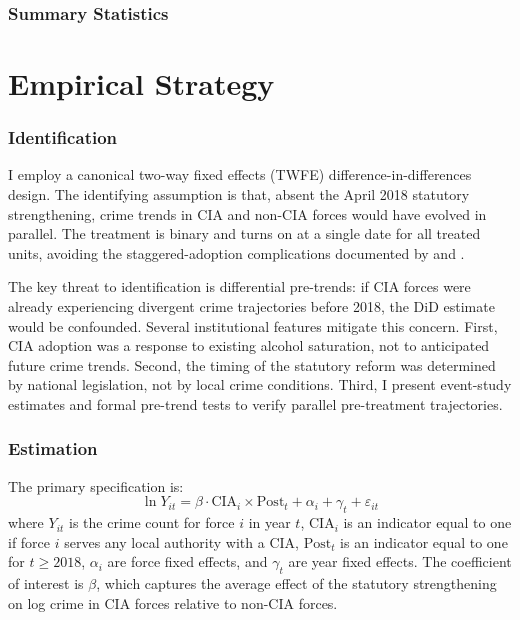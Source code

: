 \documentclass[12pt]{article}
\begin{document}
\subsubsection*{Summary Statistics}




\section{Empirical Strategy}
\label{sec:strategy}

\subsubsection*{Identification} I employ a canonical two-way fixed effects (TWFE) difference-in-differences design. The identifying assumption is that, absent the April 2018 statutory strengthening, crime trends in CIA and non-CIA forces would have evolved in parallel. The treatment is binary and turns on at a single date for all treated units, avoiding the staggered-adoption complications documented by \citet{goodman2021difference} and \citet{dechaisemartin2020two}.

The key threat to identification is differential pre-trends: if CIA forces were already experiencing divergent crime trajectories before 2018, the DiD estimate would be confounded. Several institutional features mitigate this concern. First, CIA adoption was a response to existing alcohol saturation, not to anticipated future crime trends. Second, the timing of the statutory reform was determined by national legislation, not by local crime conditions. Third, I present event-study estimates and formal pre-trend tests to verify parallel pre-treatment trajectories.

\subsubsection*{Estimation} The primary specification is:
\begin{equation}
\ln Y_{it} = \beta \cdot \text{CIA}_i \times \text{Post}_t + \alpha_i + \gamma_t + \varepsilon_{it}
\label{eq:main}
\end{equation}
where $Y_{it}$ is the crime count for force $i$ in year $t$, $\text{CIA}_i$ is an indicator equal to one if force $i$ serves any local authority with a CIA, $\text{Post}_t$ is an indicator equal to one for $t \geq 2018$, $\alpha_i$ are force fixed effects, and $\gamma_t$ are year fixed effects. The coefficient of interest is $\beta$, which captures the average effect of the statutory strengthening on log crime in CIA forces relative to non-CIA forces.
\end{document}
